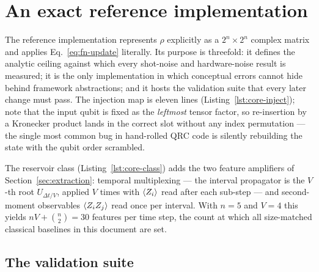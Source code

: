 \section{An exact reference implementation}
\label{sec:reference-impl}

The reference implementation represents $\rho$ explicitly as a
$2^n\times 2^n$ complex matrix and applies Eq.~\eqref{eq:fn-update} literally.
Its purpose is threefold: it defines the analytic ceiling against which every
shot-noise and hardware-noise result is measured; it is the only
implementation in which conceptual errors cannot hide behind framework
abstractions; and it hosts the validation suite that every later change must
pass. The injection map is eleven lines
(Listing~\ref{lst:core-inject}); note that the input qubit is fixed as the
\emph{leftmost} tensor factor, so re-insertion by a Kronecker product lands in
the correct slot without any index permutation --- the single most common bug
in hand-rolled QRC code is silently rebuilding the state with the qubit order
scrambled.

\begin{strip}

\end{strip}

The reservoir class (Listing~\ref{lst:core-class}) adds the two feature
amplifiers of Section~\ref{sec:extraction}: temporal multiplexing --- the
interval propagator is the $V$-th root $U_{\Delta t/V}$, applied $V$ times
with $\langle Z_i\rangle$ read after each sub-step --- and second-moment observables
$\langle Z_iZ_j\rangle$ read once per interval. With $n=5$ and $V=4$ this yields
$nV + \binom{n}{2} = 30$ features per time step, the count at which all
size-matched classical baselines in this document are set.

\begin{strip}

\end{strip}

\subsection{The validation suite}
\label{sec:validation-suite}

